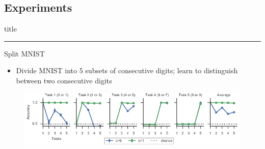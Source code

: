 \documentclass{beamer}
\begin{document}
\subsection{Experiments}
\begin{frame}[plain]
\vfill
\centering
\begin{beamercolorbox}[sep=8pt,center,shadow=true,rounded=true]{title}
	\insertsectionhead\par%
	\color{oxfordblue}\noindent\rule{10cm}{1pt}
\end{beamercolorbox}
\vfill
\end{frame}
\begin{frame}{Split MNIST}
\begin{itemize}
	\item Divide MNIST into 5 subsets of consecutive digits; learn to distinguish between two consecutive digits
\end{itemize}
\begin{figure}
	
	\centering
	\includegraphics[width=\textwidth]{ML3}
\end{figure}
\end{frame}
\end{document}
